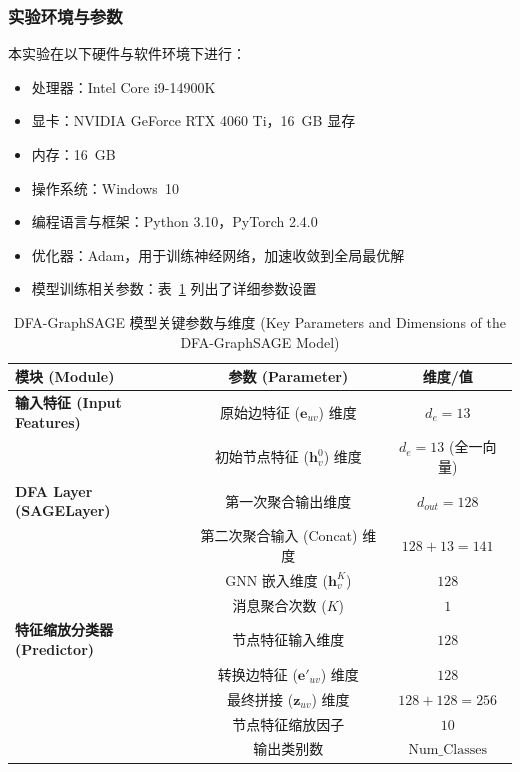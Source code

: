 \documentclass{article}
\begin{document}
\subsubsection{实验环境与参数}
本实验在以下硬件与软件环境下进行：
\begin{itemize}
    \item 处理器：Intel Core i9-14900K
    \item 显卡：NVIDIA GeForce RTX 4060 Ti，16~GB 显存
    \item 内存：16~GB
    \item 操作系统：Windows~10
    \item 编程语言与框架：Python 3.10，PyTorch 2.4.0
    \item 优化器：Adam，用于训练神经网络，加速收敛到全局最优解
    \item 模型训练相关参数：表~\ref{tab:dfasage_parameters} 列出了详细参数设置
\end{itemize}

\begin{table}[H]
\centering
\caption{DFA-GraphSAGE 模型关键参数与维度 (Key Parameters and Dimensions of the DFA-GraphSAGE Model)}
\label{tab:dfasage_parameters}
\begin{tabular}{lcc}
\toprule %
\textbf{模块 (Module)} & \textbf{参数 (Parameter)} & \textbf{维度/值 } \\
\midrule %
\textbf{输入特征 (Input Features)} & 原始边特征 ($\mathbf{e}_{uv}$) 维度 & $d_e=13$ \\
& 初始节点特征 ($\mathbf{h}_v^0$) 维度 & $d_{e}=13$ (全一向量) \\
\midrule %
\textbf{DFA Layer (SAGELayer)} & 第一次聚合输出维度 & $d_{out}=128$ \\
& 第二次聚合输入 (Concat) 维度 & $128 + 13 = 141$ \\
& GNN 嵌入维度 ($\mathbf{h}_v^K$) & $128$ \\
& 消息聚合次数 ($K$) & $1$ \\
\midrule %
\textbf{特征缩放分类器 (Predictor)} & 节点特征输入维度 & $128$ \\
& 转换边特征 ($\mathbf{e}'_{uv}$) 维度 & $128$ \\
& 最终拼接 ($\mathbf{z}_{uv}$) 维度 & $128 + 128 = 256$ \\
& 节点特征缩放因子 & $10$ \\
& 输出类别数 & $\text{Num\_Classes}$ \\
\bottomrule %
\end{tabular}
\end{table}
\end{document}

